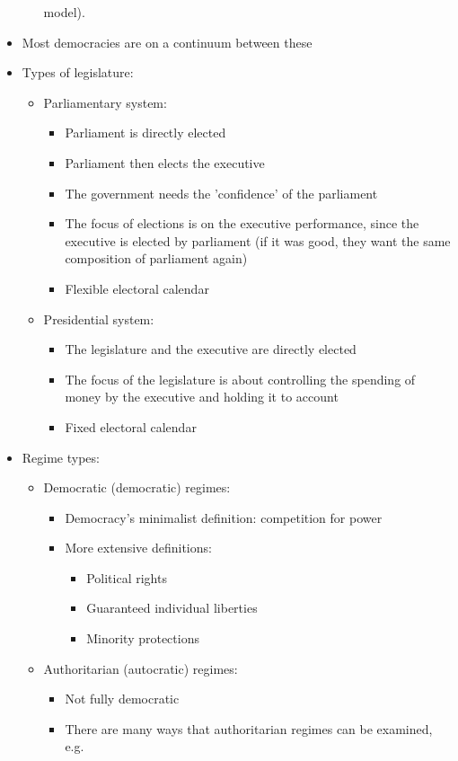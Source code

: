 \documentclass[11pt]{article}
\begin{document}
\begin{itemize}
\begin{itemize}
model).
\end{itemize}
\item Most democracies are on a continuum between these
\item Types of legislature:
\begin{itemize}
\item Parliamentary system:
\begin{itemize}
\item Parliament is directly elected
\item Parliament then elects the executive
\item The government needs the 'confidence' of the parliament
\item The focus of elections is on the executive performance, since the
executive is elected by parliament (if it was good, they want the same
composition of parliament again)
\item Flexible electoral calendar
\end{itemize}
\item Presidential system:
\begin{itemize}
\item The legislature and the executive are directly elected
\item The focus of the legislature is about controlling the spending of money by
the executive and holding it to account
\item Fixed electoral calendar
\end{itemize}
\end{itemize}
\item Regime types:
\begin{itemize}
\item Democratic (democratic) regimes:
\begin{itemize}
\item Democracy's minimalist definition: competition for power
\item More extensive definitions:
\begin{itemize}
\item Political rights
\item Guaranteed individual liberties
\item Minority protections
\end{itemize}
\end{itemize}
\item Authoritarian (autocratic) regimes:
\begin{itemize}
\item Not fully democratic
\item There are many ways that authoritarian regimes can be examined, e.g.

\end{itemize}
\end{itemize}
\end{itemize}
\end{document}
